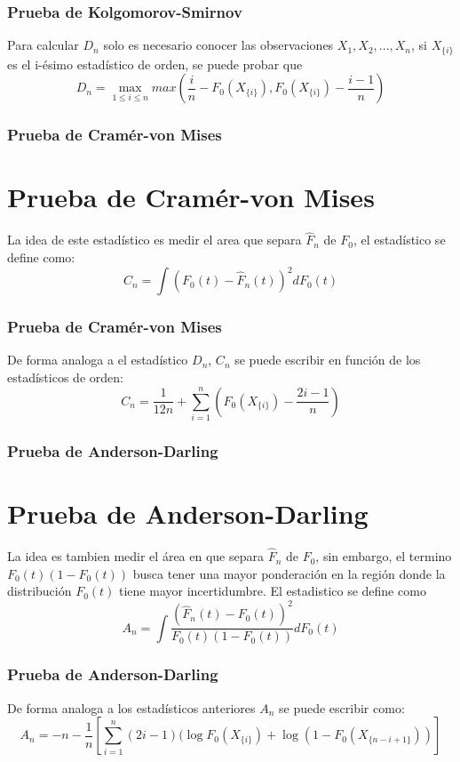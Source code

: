 \documentclass[aspectratio=169,spanish]{beamer}
\begin{document}
\begin{frame}
\frametitle{Prueba de Kolgomorov-Smirnov}
Para calcular $D_n$ solo es necesario conocer las observaciones $X_1,X_2,...,X_n$, si $X_{\{i\}}$ es el i-ésimo estadístico de orden, se puede probar que $$D_n =\max_{1\le i\le n}max(\frac{i}{n}-F_0(X_{\{i\}}),F_0(X_{\{i\}})-\frac{i-1}{n})$$
\end{frame}

\begin{frame}
\frametitle{Prueba de Cramér-von Mises}
\section{Prueba de Cramér-von Mises}
La idea de este estadístico es medir el area que separa $\hat{F}_n$ de $F_0$, el estadístico se define como:
$$C_n=\int(F_0(t)-\hat{F}_n(t))^2dF_0(t)$$
\end{frame}
\begin{frame}
\frametitle{Prueba de Cramér-von Mises}
De forma analoga a el estadístico $D_n$, $C_n$ se puede escribir en función de los estadísticos de orden: 
$$C_n=\frac{1}{12n}+\sum_{i=1}^{n}\left(F_0(X_{\{i\}})-\frac{2i-1}{n}\right)$$ 
\end{frame}
\begin{frame}
\frametitle{Prueba de Anderson-Darling}
\section{Prueba de Anderson-Darling}
La idea es tambien medir el área en que separa $\hat{F}_n$ de $F_0$, sin embargo, el termino $F_0(t)(1-F_0(t))$ busca tener una mayor ponderación en la región donde la distribución $F_0(t)$ tiene mayor incertidumbre. El estadistico se define como 
$$A_n=\int\frac{(\hat{F}_n(t)-F_0(t))^2}{F_0(t)(1-F_0(t))}dF_0(t)$$
\end{frame}
\begin{frame}
\frametitle{Prueba de Anderson-Darling}
De forma analoga a los estadísticos anteriores $A_n$ se puede escribir como:
$$A_n=-n-\frac{1}{n}\left[\sum_{i=1}^{n}(2i-1)(\log F_0(X_{\{i\}})+\log(1-F_0(X_{\{n-i+1\}}))\right]$$
\end{frame}
\end{document}

